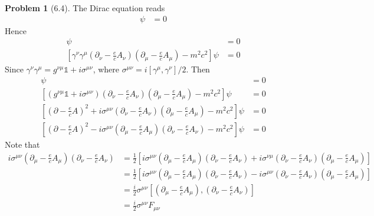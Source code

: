 \documentclass[twoside,11pt]{article}
\theoremstyle{definition}
\newtheorem{problem}{Problem}
\theoremstyle{remark}
\begin{document}
\begin{problem}[6.4]
The Dirac equation reads
\begin{align*}
    [-\gamma^\mu(\partial_\mu - \frac{e}{c}A_\mu) + mc]\psi &= 0
\end{align*}
Hence
\begin{align*}
    [-\gamma^\nu(\partial_\nu - \frac{e}{c}A_\nu) - mc]
    [-\gamma^\mu(\partial_\mu - \frac{e}{c}A_\mu) + mc]
    \psi &= 0\\
    [
    \gamma^\nu
    \gamma^\mu
    (\partial_\nu - \frac{e}{c}A_\nu)
    (\partial_\mu - \frac{e}{c}A_\mu)
    - m^2c^2]
    \psi &= 0
\end{align*}
Since $\gamma^\nu\gamma^\mu = g^{\nu\mu}\mathbb{1} + i\sigma^{\mu\nu}$, 
where $\sigma^{\mu\nu}=i[\gamma^\mu,\gamma^\nu]/2$.
Then
\begin{align*}
    [\gamma^\nu\gamma^\mu
    (\partial_\nu - \frac{e}{c}A_\nu)
    (\partial_\mu - \frac{e}{c}A_\mu)
    - m^2c^2]
    \psi &= 0\\
    [(g^{\nu\mu}\mathbb{1} + i\sigma^{\mu\nu})
    (\partial_\nu - \frac{e}{c}A_\nu)
    (\partial_\mu - \frac{e}{c}A_\mu)
    - m^2c^2]
    \psi &= 0\\
    [
    (\partial - \frac{e}{c}A)^2
    + i\sigma^{\mu\nu}
    (\partial_\nu - \frac{e}{c}A_\nu)
    (\partial_\mu - \frac{e}{c}A_\mu)
    - m^2c^2]
    \psi &= 0\\
    [
    (\partial - \frac{e}{c}A)^2
    - i\sigma^{\mu\nu}
    (\partial_\mu - \frac{e}{c}A_\mu)
    (\partial_\nu - \frac{e}{c}A_\nu)
    - m^2c^2]
    \psi &= 0
\end{align*}
Note that
\begin{align*}
    i\sigma^{\mu\nu}
    (\partial_\mu - \frac{e}{c}A_\mu)
    (\partial_\nu - \frac{e}{c}A_\nu)
    &= \frac{1}{2}[
    i\sigma^{\mu\nu}
    (\partial_\mu - \frac{e}{c}A_\mu)
    (\partial_\nu - \frac{e}{c}A_\nu)
    + 
    i\sigma^{\nu\mu}
    (\partial_\nu - \frac{e}{c}A_\nu)
    (\partial_\mu - \frac{e}{c}A_\mu)
    ]\\
    &= \frac{1}{2}[
    i\sigma^{\mu\nu}
    (\partial_\mu - \frac{e}{c}A_\mu)
    (\partial_\nu - \frac{e}{c}A_\nu)
    -
    i\sigma^{\mu\nu}
    (\partial_\nu - \frac{e}{c}A_\nu)
    (\partial_\mu - \frac{e}{c}A_\mu)
    ]\\
    &= \frac{i}{2}\sigma^{\mu\nu}[
    (\partial_\mu - \frac{e}{c}A_\mu),
    (\partial_\nu - \frac{e}{c}A_\nu)
    ]\\
    &= \frac{i}{2}\sigma^{\mu\nu}F_{\mu\nu}
\end{align*}

\end{problem}


\end{document}
